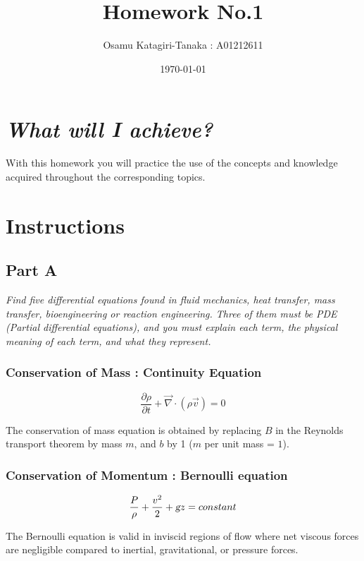 \documentclass{article}
\title{Homework No.1}
\author{Osamu Katagiri-Tanaka : A01212611}
\date{\today}
\begin{document}
\maketitle

\section*{\emph{What will I achieve?}}
With this homework you will practice the use of the concepts and knowledge acquired throughout the corresponding topics.

\section*{Instructions}

\subsection*{Part A}
\textit{Find five differential equations found in fluid mechanics, heat transfer, mass transfer, bioengineering or reaction engineering. Three of them must be PDE (Partial differential equations), and you must explain each term, the physical meaning of each term, and what they represent.}

\subsubsection*{Conservation of Mass : Continuity Equation}

\begin{equation}
\frac{\partial \rho}{\partial t} + \vec{\nabla} \cdot (\rho \vec{v}) = 0
\end{equation}

The conservation of mass equation
is obtained by replacing $B$ in the Reynolds transport theorem by mass $m$, and $b$ by 1 ($m$ per unit mass = $1$).

\subsubsection*{Conservation of Momentum : Bernoulli equation}

\begin{equation}
\frac{P}{\rho} + \frac{v^2}{2} + \textsl{g} z = constant
\end{equation}

The Bernoulli equation is valid in inviscid regions of flow where net viscous forces are negligible compared to inertial, gravitational, or pressure forces.
\end{document}
